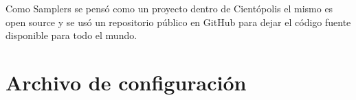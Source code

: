 Como Samplers se pensó como un proyecto dentro de Cientópolis\cite{cientopolis} el mismo es open source y se usó un repositorio público en GitHub\cite{github} para dejar el código fuente disponible para todo el mundo.

\section{Archivo de configuración}\label{sec:archivo_configuracion}

